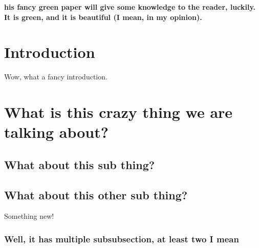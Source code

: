 \documentclass[DIV=calc, paper=a4, fontsize=11pt, twocolumn]{scrartcl}	 %
\begin{document}
\maketitle %

\thispagestyle{fancy} %


\textbf{his fancy green paper will give some knowledge to the reader, luckily. It is green, and it is beautiful (I mean, in my opinion).}


\section{Introduction}

Wow, what a fancy introduction.
\lipsum[1]

\section{What is this crazy thing we are talking about?}

\lipsum[2]

\subsection{What about this sub thing?}

\lipsum[1]

\subsection{What about this other sub thing?}

Something new! 
\lipsum[1]

\subsubsection{Well, it has multiple subsubsection, at least two I mean}

\lipsum[1]
\end{document}
